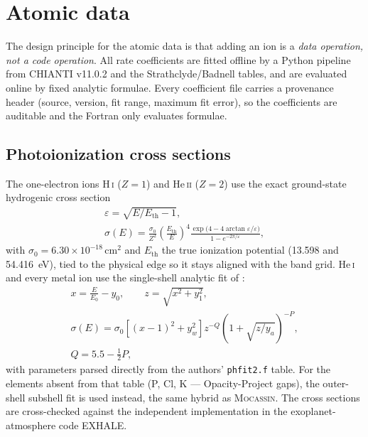 \documentclass[twocolumn,linenumbers]{aastex702}
\newcommand{\code}[1]{\texttt{#1}}
\newcommand{\HI}{H\,\textsc{i}}
\newcommand{\HeI}{He\,\textsc{i}}
\newcommand{\HeII}{He\,\textsc{ii}}
\begin{document}
\section{Atomic data}
\label{sec:atomic}

The design principle for the atomic data is that adding an ion is a
\emph{data operation, not a code operation}.  All rate coefficients are
fitted offline by a Python pipeline from CHIANTI v11.0.2
\citep{dere1997,delzanna_chianti} and the Strathclyde/Badnell tables, and
are evaluated online by fixed analytic formulae.  Every coefficient file
carries a provenance header (source, version, fit range, maximum fit
error), so the coefficients are auditable and the Fortran only evaluates
formulae.

\subsection{Photoionization cross sections}
\label{sec:xsec}

The one-electron ions \HI{} ($Z=1$) and \HeII{} ($Z=2$) use the exact
ground-state hydrogenic cross section \citep{osterbrock2006}
\begin{gather}
  \varepsilon = \sqrt{E/E_{\mathrm{th}}-1},
  \nonumber\\
  \sigma(E) = \frac{\sigma_0}{Z^2}\left(\frac{E_{\mathrm{th}}}{E}\right)^{4}
  \frac{\exp\!\big(4 - 4\arctan\varepsilon/\varepsilon\big)}
       {1 - e^{-2\pi/\varepsilon}},
  \label{eq:sighyd}
\end{gather}%
with $\sigma_0 = 6.30\times10^{-18}\,\mathrm{cm^2}$ and $E_{\mathrm{th}}$
the true ionization potential (13.598 and 54.416~eV), tied to the physical
edge so it stays aligned with the band grid.  \HeI{} and every metal ion
use the single-shell analytic fit of \citet{verner1996}:
\begin{gather}
  x = \frac{E}{E_0} - y_0,\qquad z = \sqrt{x^2 + y_1^2},
  \nonumber\\
  \sigma(E) = \sigma_0\left[(x-1)^2 + y_w^2\right]
  z^{-Q}\left(1 + \sqrt{z/y_a}\right)^{-P},
  \nonumber\\
  Q = 5.5 - \tfrac{1}{2}P,
  \label{eq:vfky}
\end{gather}%
with parameters parsed directly from the authors' \code{phfit2.f} table.
For the elements absent from that table (P, Cl, K --- Opacity-Project
gaps), the \citet{verner1995} outer-shell subshell fit is used instead,
the same hybrid as \textsc{Mocassin}.  The cross sections are cross-checked
against the independent implementation in the exoplanet-atmosphere code
EXHALE.
\end{document}

